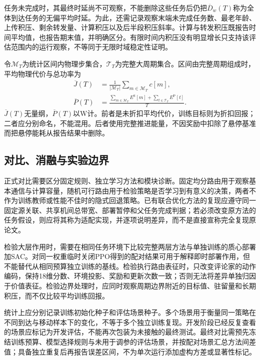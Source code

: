 任务未完成时，其最终时延尚不可观察，不能删除这些任务后仍把$\overline D_w(T)$称为全体到达任务的无偏平均时延。为此，还需记录观察末端未完成任务数、最老年龄、上传积压、剩余转发量、计算积压以及后半段积压斜率。计算与转发积压既报告时间平均值，也报告期末值，并明确区分。有限时间内积压没有明显增长只支持该评估范围内的运行观察，不等同于无限时域稳定性证明。

令$\mathcal M_T$为统计区间内物理步集合，$\mathcal T_T$为完整大周期集合。区间由完整周期组成时，平均物理代价与总功率为
\begin{equation}
 \begin{aligned}
 \overline J(T)&=\frac{1}{|\mathcal M_T|}
 \sum_{m\in\mathcal M_T}c[m],\\
 \overline P(T)&=\frac{\sum_{m\in\mathcal M_T}E^{\mathrm S}[m]
 +\sum_{t\in\mathcal T_T}E^{\mathrm P}[t]}{T}.
 \end{aligned}
 \label{eq:costpowermetrics}
\end{equation}
$\overline J(T)$无量纲，$\overline P(T)$以W计。前者是未折扣平均代价，训练目标则为折扣回报；二者应分别命名，不能混用。后者使用完整推进能量，不因奖励中扣除了悬停基准而把悬停能耗从报告结果中删除。

\subsection{对比、消融与实验边界}
正式对比需要区分固定规则、独立学习方法和模块诊断。固定均分路由用于观察基本通信与计算容量，随机可行路由用于检验策略是否学习到有意义的决策，两者不作为训练教师或性能不佳时的隐式回退策略。已有联合优化方法的复现应遵守同一固定源关联、共享机间总带宽、部署暂停和父任务完成判据；若必须改变原方法的任务假设，则应将其称为适配实现，并逐项说明差异，而不是直接宣称完全复现原论文。

检验大层作用时，需要在相同任务环境下比较完整两层方法与单独训练的质心部署加SAC。对同一权重临时关闭PPO得到的配对结果可用于解释即时部署作用，但不能替代从相同预算独立训练的基线。检验执行路由表征时，只改变评论家的动作编码，保持18维分数、环境投影、奖励和更新次数一致；否则无法将差异单独归因于价值表征。检验边界处理时，应同时观察周期边界附近的目标值、驻留量和长期积压，而不仅比较平均训练回报。

统计上应分别记录训练初始化种子和评估场景种子。多个场景用于衡量同一策略在不同到达与移动样本下的变化，不等于多个独立训练复现。开发阶段已经反复查看的场景应标记为开发评估，不能再次包装为未接触的最终测试。最终对比需预先冻结训练预算、模型选择规则与未用于调参的评估场景，并按配对场景汇总方法间差值；具备独立重复后再报告误差区间，不为单次运行添加虚构方差或显著性标记。

